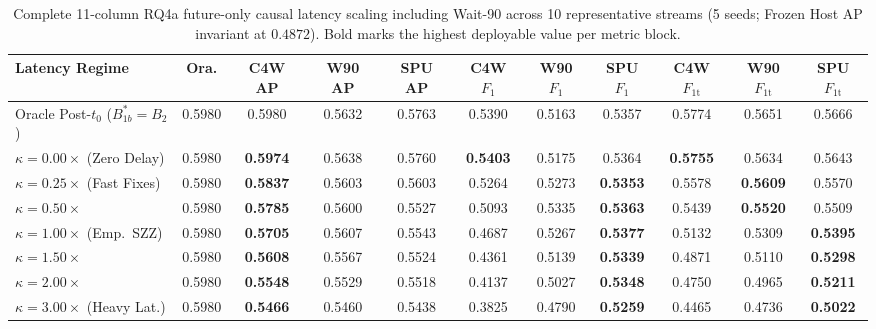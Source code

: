 \documentclass[10pt,a4paper]{article}
\begin{document}
\begin{table}[!htbp]
\centering
\caption{Complete 11-column RQ4a future-only causal latency scaling including Wait-90 across 10 representative streams (5 seeds; Frozen Host AP invariant at $0.4872$). Bold marks the highest deployable value per metric block.}
\label{tab:or_rq4a_kappa_full}
\fontsize{7.5}{9.0}\selectfont
\setlength{\tabcolsep}{1.8pt}
\begin{tabular*}{\textwidth}{@{\extracolsep\fill}lcccccccccc@{}}
\toprule
\textbf{Latency Regime} & \textbf{Ora.} & \textbf{C4W AP} & \textbf{W90 AP} & \textbf{SPU AP} & \textbf{C4W $F_1$} & \textbf{W90 $F_1$} & \textbf{SPU $F_1$} & \textbf{C4W $F_{1\mathrm{t}}$} & \textbf{W90 $F_{1\mathrm{t}}$} & \textbf{SPU $F_{1\mathrm{t}}$} \\
\midrule
Oracle Post-$t_0$ ($B_{1b}^* = B_2$) & 0.5980 & 0.5980 & 0.5632 & 0.5763 & 0.5390 & 0.5163 & 0.5357 & 0.5774 & 0.5651 & 0.5666 \\
\midrule
$\kappa = 0.00\times$ (Zero Delay) & 0.5980 & \textbf{0.5974} & 0.5638 & 0.5760 & \textbf{0.5403} & 0.5175 & 0.5364 & \textbf{0.5755} & 0.5634 & 0.5643 \\
$\kappa = 0.25\times$ (Fast Fixes) & 0.5980 & \textbf{0.5837} & 0.5603 & 0.5603 & 0.5264 & 0.5273 & \textbf{0.5353} & 0.5578 & \textbf{0.5609} & 0.5570 \\
$\kappa = 0.50\times$ & 0.5980 & \textbf{0.5785} & 0.5600 & 0.5527 & 0.5093 & 0.5335 & \textbf{0.5363} & 0.5439 & \textbf{0.5520} & 0.5509 \\
$\kappa = 1.00\times$ (Emp.\ SZZ) & 0.5980 & \textbf{0.5705} & 0.5607 & 0.5543 & 0.4687 & 0.5267 & \textbf{0.5377} & 0.5132 & 0.5309 & \textbf{0.5395} \\
$\kappa = 1.50\times$ & 0.5980 & \textbf{0.5608} & 0.5567 & 0.5524 & 0.4361 & 0.5139 & \textbf{0.5339} & 0.4871 & 0.5110 & \textbf{0.5298} \\
$\kappa = 2.00\times$ & 0.5980 & \textbf{0.5548} & 0.5529 & 0.5518 & 0.4137 & 0.5027 & \textbf{0.5348} & 0.4750 & 0.4965 & \textbf{0.5211} \\
$\kappa = 3.00\times$ (Heavy Lat.) & 0.5980 & \textbf{0.5466} & 0.5460 & 0.5438 & 0.3825 & 0.4790 & \textbf{0.5259} & 0.4465 & 0.4736 & \textbf{0.5022} \\
\bottomrule
\end{tabular*}
\end{table}
\end{document}
